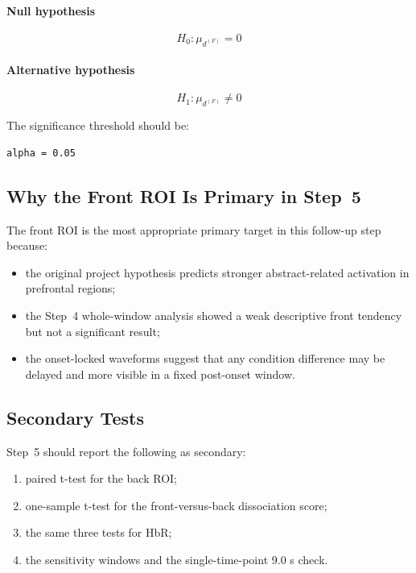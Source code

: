 \paragraph{Null hypothesis}
\begin{equation}
H_0: \mu_{d^{(F)}} = 0
\end{equation}

\paragraph{Alternative hypothesis}
\begin{equation}
H_1: \mu_{d^{(F)}} \neq 0
\end{equation}

The significance threshold should be:
\begin{verbatim}
alpha = 0.05
\end{verbatim}

\subsection{Why the Front ROI Is Primary in Step~5}
The front ROI is the most appropriate primary target in this follow-up step because:
\begin{itemize}
    \item the original project hypothesis predicts stronger abstract-related activation in prefrontal regions;
    \item the Step~4 whole-window analysis showed a weak descriptive front tendency but not a significant result;
    \item the onset-locked waveforms suggest that any condition difference may be delayed and more visible
    in a fixed post-onset window.
\end{itemize}

\subsection{Secondary Tests}
Step~5 should report the following as secondary:
\begin{enumerate}
    \item paired t-test for the back ROI;
    \item one-sample t-test for the front-versus-back dissociation score;
    \item the same three tests for HbR;
    \item the sensitivity windows and the single-time-point 9.0 s check.
\end{enumerate}

